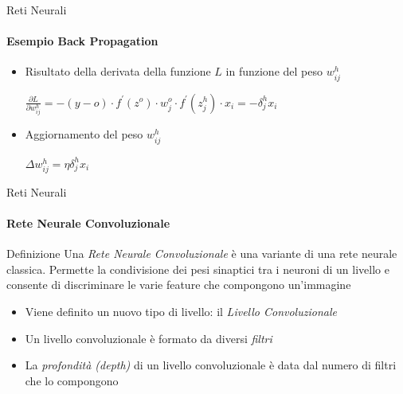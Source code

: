 \documentclass[
 ]{beamer}
\begin{document}
\begin{frame}{Reti Neurali}
    \framesubtitle{Esempio Back Propagation}
    \begin{itemize} [<+->]
        \setlength\itemsep{3em}
        \item \large Risultato della derivata della funzione $L$ in funzione del peso $w_{ij}^{h}$
        \bigskip 
        \begin{center}
         \large $ \frac{\partial L}{\partial w_{ij}^{h}} =  -(y - o) \cdot f^{\prime}(z^{o}) \cdot w_j^{o} \cdot f^{\prime}(z_j^{h}) \cdot x_i = -\delta_j^{h}x_i$         
         \end{center}
         \item \large Aggiornamento del peso $w_{ij}^{h}$
         \bigskip
         \begin{center}
         \large $ \Delta w_{ij}^{h} = \eta\delta_j^{h}x_i$         
         \end{center}       
    \end{itemize}
\end{frame}

\begin{frame}{Reti Neurali}
    \framesubtitle{Rete Neurale Convoluzionale}
    
    \begin{block}{Definizione}  
    Una \emph{Rete Neurale Convoluzionale} è una variante di una rete neurale classica. Permette la condivisione dei pesi sinaptici tra i neuroni di un livello e consente di discriminare le varie feature che compongono un'immagine
    \end{block}\pause
    
    \bigskip
    
    \begin{itemize} [<+->]
        \setlength\itemsep{1em}
        \item \large Viene definito un nuovo tipo di livello: il \emph{Livello Convoluzionale}
        \item \large Un livello convoluzionale è formato da diversi \emph{filtri}
        \item \large La \emph{profondità (depth)} di un livello convoluzionale è data dal numero di filtri che lo compongono
    \end{itemize}    
\end{frame}
\end{document}
